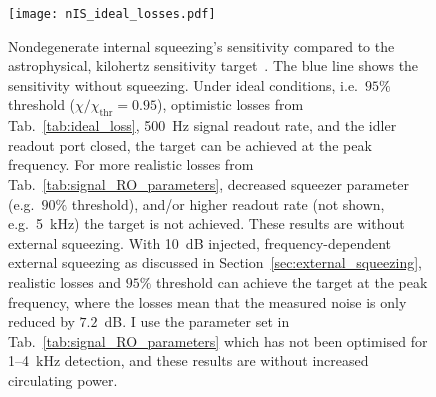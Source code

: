 \begin{figure}
    \centering
    \texttt{[image: nIS\_ideal\_losses.pdf]}
    \caption{  Nondegenerate internal squeezing's sensitivity compared to the astrophysical, kilohertz sensitivity target~\cite{miaoDesignGravitationalWaveDetectors2018}. The blue line shows the sensitivity without squeezing. Under ideal conditions, i.e.\ $95\%$ threshold ($\chi/\chi_\text{thr}=0.95$), optimistic losses from Tab.~\ref{tab:ideal_loss}, 500~Hz signal readout rate, and the idler readout port closed, the target can be achieved at the peak frequency. For more realistic losses from Tab.~\ref{tab:signal_RO_parameters}, decreased squeezer parameter (e.g.\ $90\%$ threshold), and/or higher readout rate (not shown, e.g.\ 5~kHz) the target is not achieved. These results are without external squeezing. With 10~dB injected, frequency-dependent external squeezing as discussed in Section~\ref{sec:external_squeezing}, realistic losses and $95\%$ threshold can achieve the target at the peak frequency, where the losses mean that the measured noise is only reduced by $7.2$~dB.
    I use the parameter set in Tab.~\ref{tab:signal_RO_parameters} which has not been optimised for 1--4~kHz detection, and these results are without increased circulating power.}
    \label{fig:nIS_sens_target}
\end{figure}

